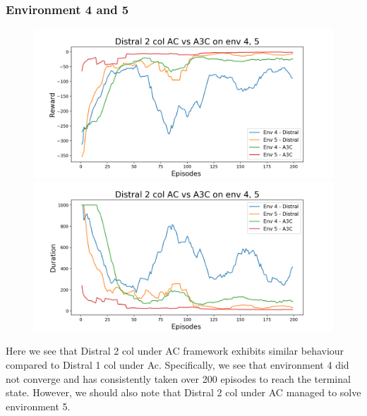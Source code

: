\documentclass[12pt]{report}
\begin{document}
\subsubsection{Environment 4 and 5}
\begin{figure}[H]
\centering
\begin{minipage}{.5\textwidth}
\centering
\includegraphics[width=\textwidth]{figs/d2_col_ac/d2_col_ac_4_5_rwd.png}
\end{minipage}%
\centering
\begin{minipage}{.5\textwidth}
\centering
\includegraphics[width=\textwidth]{figs/d2_col_ac/d2_col_ac_4_5_dur.png}
\end{minipage}%
\end{figure}
Here we see that Distral 2 col under AC framework exhibits similar behaviour compared to Distral 1 col under Ac. Specifically, we see that environment 4 did not converge and has consistently taken over 200 episodes to reach the terminal state. However, we should also note that Distral 2 col under AC managed to solve environment 5.
\end{document}
